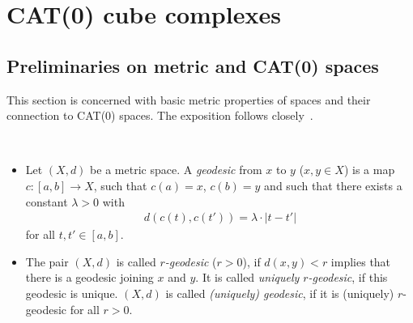 \section{CAT(0) cube complexes}
\label{sec:complexes}

\subsection{Preliminaries on metric and CAT(0) spaces}
\label{sec:metric}
This section is concerned with basic metric properties of spaces and their connection to CAT(\(0\)) spaces. The exposition follows closely~\cite{MR1744486}.

\begin{defin}~
  \begin{itemize}
  \item Let \((X, d)\) be a metric space. A \emph{geodesic} from \(x\) to \(y\) (\(x,y \in X\)) is a map \(c\colon [a,b] \to X\), such that \(c(a) = x\), \(c(b) = y\) and such that there exists a constant \(\lambda > 0\) with
    \begin{align*}
      d(c(t), c(t')) = \lambda \cdot |t - t'| 
    \end{align*}
    for all \(t,t' \in [a,b]\).
  \item The pair \((X,d)\) is called \emph{\(r\)-geodesic} (\(r > 0\)), if \(d(x,y) < r\) implies that there is a geodesic joining \(x\) and \(y\). It is called \emph{uniquely \(r\)-geodesic}, if this geodesic is unique. \((X,d)\) is called \emph{(uniquely) geodesic}, if it is (uniquely) \(r\)-geodesic for all \(r > 0\).
  \end{itemize}
\end{defin}

